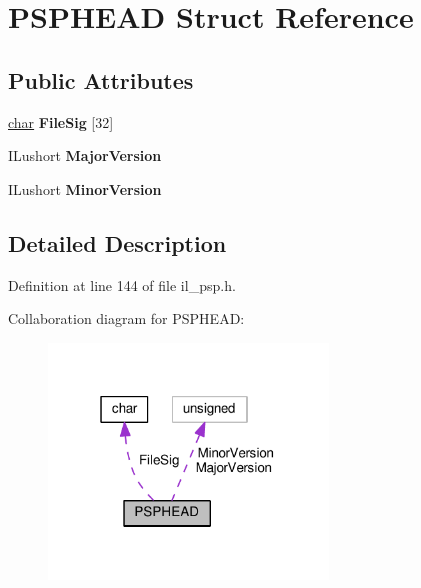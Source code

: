 \hypertarget{structPSPHEAD}{}\section{P\+S\+P\+H\+E\+AD Struct Reference}
\label{structPSPHEAD}
\subsection*{Public Attributes}
\begin{DoxyCompactItemize}
\item 
\mbox{\label{structPSPHEAD_a2725e88d92ed72d8b98cc0c75aee7012}} 
\hyperlink{classchar}{char} {\bfseries File\+Sig} \mbox{[}32\mbox{]}
\item 
\mbox{\label{structPSPHEAD_a8ff2d7beb0fe666c9f8513758f7f7086}} 
I\+Lushort {\bfseries Major\+Version}
\item 
\mbox{\label{structPSPHEAD_a34701bcf5a1dcfa00baeb4079ba7397d}} 
I\+Lushort {\bfseries Minor\+Version}
\end{DoxyCompactItemize}


\subsection{Detailed Description}


Definition at line 144 of file il\+\_\+psp.\+h.



Collaboration diagram for P\+S\+P\+H\+E\+AD\+:
\nopagebreak
\begin{figure}[H]
\begin{center}
\leavevmode
\includegraphics[width=211pt]{d1/df8/structPSPHEAD__coll__graph}
\end{center}
\end{figure}


